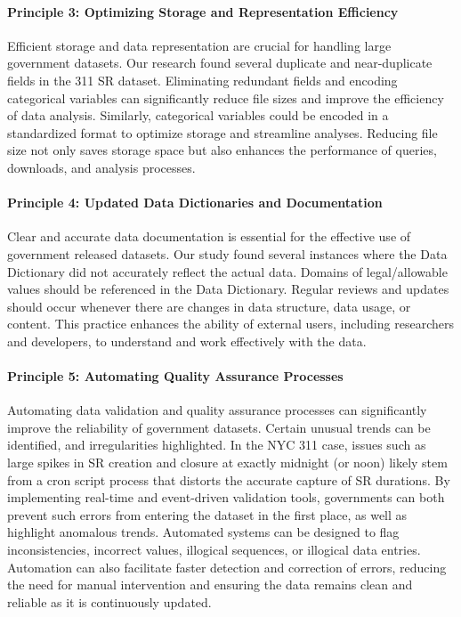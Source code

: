 \documentclass[linenumber]{jdsart}
\begin{document}
\paragraph{Principle 3: Optimizing Storage and Representation Efficiency}
Efficient storage and data representation are crucial for handling 
large government datasets. Our research found several duplicate and
near\mbox{-}duplicate fields in the 311 SR dataset. Eliminating 
redundant fields and encoding categorical variables can 
significantly reduce file sizes and improve the efficiency 
of data analysis. Similarly, categorical variables could be 
encoded in a standardized format to optimize storage and 
streamline analyses. Reducing file size not only saves 
storage space but also enhances the performance of queries, 
downloads,  and analysis processes.


\paragraph{Principle 4: Updated Data Dictionaries and Documentation}
Clear and accurate data documentation is essential for the effective use 
of government released datasets. Our study found several 
instances where the Data Dictionary did not accurately reflect the 
actual data. Domains of legal/allowable values should be referenced
in the Data Dictionary. Regular reviews and updates should 
occur whenever there are changes in data structure, data usage, or 
content. This practice enhances the ability of external users, 
including researchers and developers, to understand and work 
effectively with the data.

\paragraph{Principle 5: Automating Quality Assurance Processes}
Automating data validation and quality assurance processes can 
significantly improve the reliability of government datasets. Certain
unusual trends can be identified, and irregularities highlighted. 
In the NYC 311 case, issues such as large spikes in SR 
creation and closure at exactly midnight (or noon) likely 
stem from a cron script process that distorts the 
accurate capture of SR durations. By implementing 
real\mbox{-}time and event\mbox{-}driven validation tools, governments 
can both prevent such errors from entering the dataset in the first 
place, as well as highlight anomalous trends. Automated 
systems can be designed to flag inconsistencies, incorrect values, 
illogical sequences, or illogical data entries. Automation can 
also facilitate faster detection and correction of errors, reducing 
the need for manual intervention and ensuring the data 
remains clean and reliable as it is continuously updated.
\end{document}
